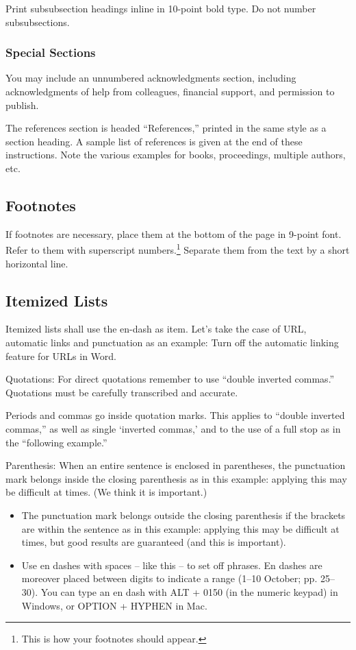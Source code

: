 \documentclass[letterpaper]{article}
\begin{document}
Print subsubsection headings inline in 10-point bold type. Do not number subsubsections.

\subsubsection{Special Sections}

You may include an unnumbered acknowledgments section, including acknowledgments of help from colleagues, financial support, and permission to publish.

The references section is headed ``References,'' printed in the same style as a section heading. A sample list of references is given at the end of these instructions.  Note the various examples for books, proceedings, multiple authors, etc. 

\subsection{Footnotes}

If footnotes are necessary, place them at the bottom of the page in 9-point font. Refer to them with superscript numbers.\footnote{This is how your footnotes should appear.} Separate them from the text by a short horizontal line. 

\subsection{Itemized Lists}

Itemized lists shall use the en-dash as item. Let’s take the case of URL, automatic links and punctuation as an example:
Turn off the automatic linking feature for URLs in Word.

Quotations: For direct quotations remember to use ``double inverted commas.'' Quotations must be carefully transcribed and accurate. 

Periods and commas go inside quotation marks. This applies to ``double inverted commas,'' as well as single `inverted commas,' and to the use of a full stop as in the ``following example.'' 

Parenthesis: When an entire sentence is enclosed in parentheses, the punctuation mark belongs inside the closing parenthesis as in this example: applying this may be difficult at times. (We think it is important.)

\begin{itemize}
\item The punctuation mark belongs outside the closing parenthesis if the brackets are within the sentence as in this example: applying this may be difficult at times, but good results are guaranteed (and this is important).
\item Use en dashes with spaces -- like this -- to set off phrases. En dashes are moreover placed between digits to indicate a range (1--10 October; pp. 25--30). You can type an en dash with ALT + 0150 (in the numeric keypad) in Windows, or OPTION + HYPHEN in Mac.
\end{itemize}
\end{document}
